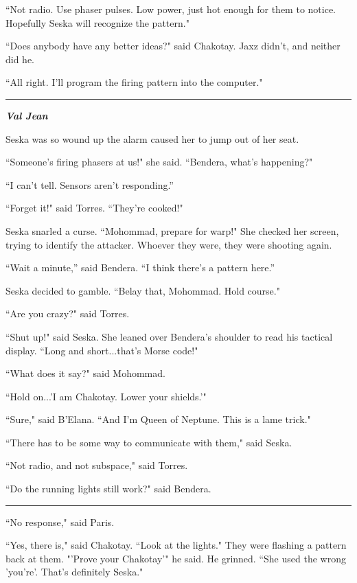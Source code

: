 \documentclass[twoside,letterpaper,12pt]{memoir}
\begin{document}
``Not radio. Use phaser pulses. Low power, just hot enough for them to notice. Hopefully Seska will recognize the pattern."

``Does anybody have any better ideas?" said Chakotay. Jaxz didn't, and neither did he.

``All right. I'll program the firing pattern into the computer."

\begin{center}\rule{3cm}{0.4 pt}\end{center}

\textit{\textbf{Val Jean}}

Seska was so wound up the alarm caused her to jump out of her seat.

``Someone's firing phasers at us!" she said. ``Bendera, what’s happening?"

“I can’t tell. Sensors aren’t responding.”

``Forget it!" said Torres. ``They're cooked!"

Seska snarled a curse. ``Mohommad, prepare for warp!" She checked her screen, trying to identify the attacker. Whoever they were, they were shooting again.

“Wait a minute,” said Bendera. “I think there’s a pattern here.”

Seska decided to gamble. ``Belay that, Mohommad. Hold course."

``Are you crazy?" said Torres.

``Shut up!" said Seska. She leaned over Bendera’s shoulder to read his tactical display. ``Long and short...that's Morse code!"

``What does it say?" said Mohommad.

``Hold on...'I am Chakotay. Lower your shields.'"

``Sure," said B'Elana. ``And I'm Queen of Neptune. This is a lame trick."

``There has to be some way to communicate with them," said Seska.

``Not radio, and not subspace," said Torres.

``Do the running lights still work?" said Bendera.

\begin{center}\rule{3cm}{0.4 pt}\end{center}

``No response," said Paris.

``Yes, there is," said Chakotay. ``Look at the lights." They were flashing a pattern back at them. "'Prove your Chakotay'" he said. He grinned. ``She used the wrong 'you're'. That's definitely Seska."
\end{document}
